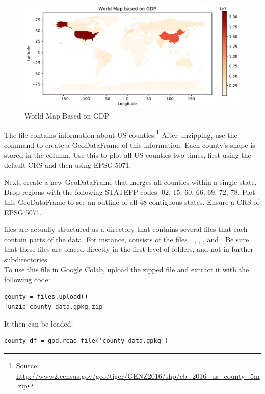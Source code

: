 \begin{figure}[H]
\begin{center}
\includegraphics[scale=.7]{figures/gdp.pdf}
\end{center}
\caption{World Map Based on GDP}
\label{figure:gdp_map}
\end{figure}


\begin{problem}
The file  contains information about US counties.\footnote{Source: \url{http://www2.census.gov/geo/tiger/GENZ2016/shp/cb_2016_us_county_5m.zip}}
After unzipping, use the command  to create a GeoDataFrame of this information.
Each county's shape is stored in the  column.
Use this to plot all US counties two times, first using the default CRS and then using EPSG:5071.

Next, create a new GeoDataFrame that merges all counties within a single state.
Drop regions with the following STATEFP codes: 02, 15, 60, 66, 69, 72, 78.
Plot this GeoDataFrame to see an outline of all 48 contiguous states.
Ensure a CRS  of EPSG:5071.
\label{problem:us_counties}
\end{problem}
\begin{info}
 files are actually structured as a directory that contains several files that each contain parts of the data.
For instance,  consists of the files , , , , and .
Be sure that these files are placed directly in the first level of folders, and not in further subdirectories.\\
To use this file in Google Colab, upload the zipped file and extract it with the following code:
\begin{lstlisting}
county = files.upload()
!unzip county_data.gpkg.zip
\end{lstlisting}
It then can be loaded:
\begin{lstlisting}
county_df = gpd.read_file('county_data.gpkg')
\end{lstlisting}
\end{info}

